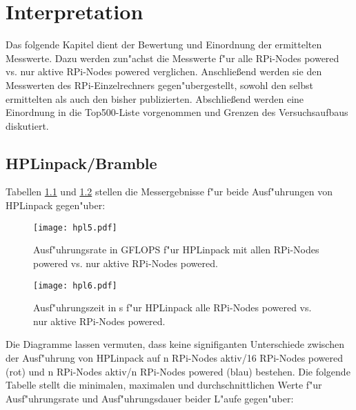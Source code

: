 \chapter{Interpretation}\label{Kap4}

Das folgende Kapitel dient der Bewertung und Einordnung der ermittelten Messwerte. Dazu werden zun"achst die Messwerte f"ur alle RPi-Nodes powered vs. nur aktive RPi-Nodes powered verglichen. Anschlie\ss end werden sie den Messwerten des RPi-Einzelrechners gegen"ubergestellt, sowohl den selbst ermittelten als auch den bisher publizierten. Abschlie\ss end werden eine Einordnung in die Top500-Liste vorgenommen und Grenzen des Versuchsaufbaus diskutiert. 

\section{HPLinpack/Bramble}\label{Interpretation-Linpack}

Tabellen \ref{fig:hpl5} und \ref{fig:hpl6} stellen die Messergebnisse f"ur beide Ausf"uhrungen von HPLinpack gegen"uber: 

\begin{figure}[htb]
  \centering
  \texttt{[image: hpl5.pdf]}\\ 
  \caption{Ausf"uhrungsrate in GFLOPS f"ur HPLinpack mit allen RPi-Nodes powered vs. nur aktive RPi-Nodes powered.}\label{fig:hpl5}
\end{figure}
\newpage
\begin{figure}[htb]
  \centering
  \texttt{[image: hpl6.pdf]}\\ 
  \caption{Ausf"uhrungszeit in s f"ur HPLinpack alle RPi-Nodes powered vs. nur aktive RPi-Nodes powered.}\label{fig:hpl6}
\end{figure}

\noindent
Die Diagramme lassen vermuten, dass keine signifiganten Unterschiede zwischen der Ausf"uhrung von HPLinpack auf n RPi-Nodes aktiv/16 RPi-Nodes powered (rot) und n RPi-Nodes aktiv/n RPi-Nodes powered (blau) bestehen. Die folgende Tabelle stellt die minimalen, maximalen und durchschnittlichen Werte f"ur Ausf"uhrungsrate und Ausf"uhrungsdauer beider L"aufe gegen"uber: 


